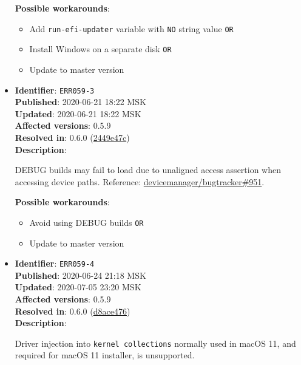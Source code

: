 \documentclass[]{article}
\providecommand{\tightlist}{%
  \setlength{\itemsep}{0pt}\setlength{\parskip}{0pt}}
\begin{document}
\begin{itemize}
  \textbf{Possible workarounds}:
  \begin{itemize}
    \tightlist
    \item Add \texttt{run-efi-updater} variable with \texttt{NO} string value \texttt{OR}
    \item Install Windows on a separate disk \texttt{OR}
    \item Update to master version
  \end{itemize}


\item
  \textbf{Identifier}: \texttt{ERR059-3} \\
  \textbf{Published}: 2020-06-21 18:22 MSK \\
  \textbf{Updated}: 2020-06-21 18:22 MSK \\
  \textbf{Affected versions}: 0.5.9 \\
  \textbf{Resolved in}: 0.6.0 (\href{https://github.com/devicemanager/OpenCorePkg/commit/2449e47cb2d110a288d491beee0b5b168d2bb480}{2449e47c}) \\
  \textbf{Description}:

  DEBUG builds may fail to load due to unaligned access assertion when accessing device paths.
  Reference: \href{https://github.com/devicemanager/bugtracker/issues/951}{devicemanager/bugtracker\#951}.

  \textbf{Possible workarounds}:
  \begin{itemize}
    \tightlist
    \item Avoid using DEBUG builds \texttt{OR}
    \item Update to master version
  \end{itemize}


\item
  \textbf{Identifier}: \texttt{ERR059-4} \\
  \textbf{Published}: 2020-06-24 21:18 MSK \\
  \textbf{Updated}: 2020-07-05 23:20 MSK \\
  \textbf{Affected versions}: 0.5.9 \\
  \textbf{Resolved in}: 0.6.0 (\href{https://github.com/devicemanager/OpenCorePkg/commit/d8ace476067ebb4b5abe17e4cdcd094fa3641689}{d8ace476}) \\
  \textbf{Description}:

  Driver injection into \texttt{kernel collections} normally used in macOS 11,
  and required for macOS 11 installer, is unsupported.


\end{itemize}
\end{document}
